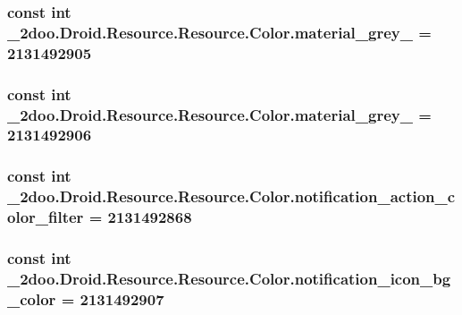 \hypertarget{class__2doo_1_1_droid_1_1_resource_1_1_color_aaa4cff1461c26be6c250fd89318131c}{
\subsubsection[{material\_\-grey\_\-850}]{\setlength{\rightskip}{0pt plus 5cm}const int \_\-2doo.Droid.Resource.Resource.Color.material\_\-grey\_ = 2131492905}}
\label{class__2doo_1_1_droid_1_1_resource_1_1_color_aaa4cff1461c26be6c250fd89318131c}


\hypertarget{class__2doo_1_1_droid_1_1_resource_1_1_color_82864afc914880f104c33c3c0bcec087}{
\subsubsection[{material\_\-grey\_\-900}]{\setlength{\rightskip}{0pt plus 5cm}const int \_\-2doo.Droid.Resource.Resource.Color.material\_\-grey\_ = 2131492906}}
\label{class__2doo_1_1_droid_1_1_resource_1_1_color_82864afc914880f104c33c3c0bcec087}


\hypertarget{class__2doo_1_1_droid_1_1_resource_1_1_color_468525a3213ef2d420fc8fd85dcbf7b8}{
\subsubsection[{notification\_\-action\_\-color\_\-filter}]{\setlength{\rightskip}{0pt plus 5cm}const int \_\-2doo.Droid.Resource.Resource.Color.notification\_\-action\_\-color\_\-filter = 2131492868}}
\label{class__2doo_1_1_droid_1_1_resource_1_1_color_468525a3213ef2d420fc8fd85dcbf7b8}


\hypertarget{class__2doo_1_1_droid_1_1_resource_1_1_color_f144c2ed67d0507236a802b9d04ccfd9}{
\subsubsection[{notification\_\-icon\_\-bg\_\-color}]{\setlength{\rightskip}{0pt plus 5cm}const int \_\-2doo.Droid.Resource.Resource.Color.notification\_\-icon\_\-bg\_\-color = 2131492907}}
\label{class__2doo_1_1_droid_1_1_resource_1_1_color_f144c2ed67d0507236a802b9d04ccfd9}


